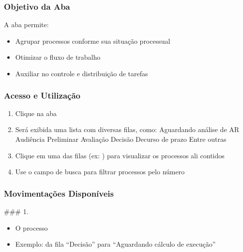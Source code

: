 \documentclass[letterpaper,10pt,brazil]{sphinxmanual}
\begin{document}
\subsubsection{Objetivo da Aba}
\label{\detokenize{projud_10_filasprocessuais:objetivo-da-aba}}
\sphinxAtStartPar
A aba  permite:
\begin{itemize}
\item {} 
\sphinxAtStartPar
Agrupar processos conforme sua situação processual

\item {} 
\sphinxAtStartPar
Otimizar o fluxo de trabalho

\item {} 
\sphinxAtStartPar
Auxiliar no controle e distribuição de tarefas

\end{itemize}


\subsubsection{Acesso e Utilização}
\label{\detokenize{projud_10_filasprocessuais:acesso-e-utilizacao}}\begin{enumerate}
%
\item {} 
\sphinxAtStartPar
Clique na aba 

\item {} 
\sphinxAtStartPar
Será exibida uma lista com diversas filas, como:
\sphinxhyphen{} Aguardando análise de AR
\sphinxhyphen{} Audiência
\sphinxhyphen{} Preliminar
\sphinxhyphen{} Avaliação
\sphinxhyphen{} Decisão
\sphinxhyphen{} Decurso de prazo
\sphinxhyphen{} Entre outras

\item {} 
\sphinxAtStartPar
Clique em uma das filas (ex: ) para visualizar os processos ali contidos

\item {} 
\sphinxAtStartPar
Use o campo de busca para filtrar processos pelo número

\end{enumerate}


\subsubsection{Movimentações Disponíveis}
\label{\detokenize{projud_10_filasprocessuais:movimentacoes-disponiveis}}
\sphinxAtStartPar
\#\#\# 1. 
\begin{itemize}
\item {} 
\sphinxAtStartPar
O processo 

\item {} 
\sphinxAtStartPar
Exemplo: da fila “Decisão” para “Aguardando cálculo de execução”

\end{itemize}
\end{document}
